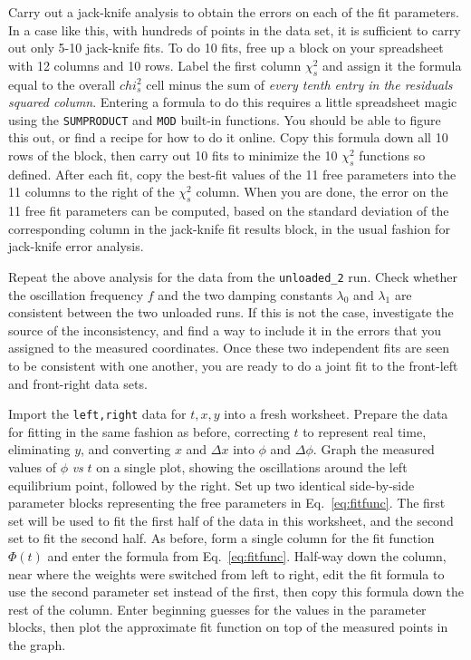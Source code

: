\documentclass{revtex4}
\begin{document}
Carry out a jack-knife analysis to obtain the errors on each of the fit
parameters.  In a case like this, with hundreds of points in the data set,
it is sufficient to carry out only 5-10 jack-knife fits.  To do 10 fits,
free up a block on your spreadsheet with 12 columns and 10 rows.  Label the
first column $\chi_s^2$ and assign it the formula equal to the overall
$chi_s^2$ cell minus the sum of {\em every tenth entry in the residuals
squared column}.  Entering a formula to do this requires a little
spreadsheet magic using the {\tt SUMPRODUCT} and {\tt MOD}
built-in functions.  You should be able to figure this out, or find a
recipe for how to do it online.  Copy this formula down all 10 rows of
the block, then carry out 10 fits to minimize the 10 $\chi_s^2$ functions
so defined.  After each fit, copy the best-fit values of the 11 free
parameters into the 11 columns to the right of the $\chi_s^2$ column.
When you are done, the error on the 11 free fit parameters can be
computed, based on the standard deviation of the corresponding column
in the jack-knife fit results block, in the usual fashion for jack-knife
error analysis.

Repeat the above analysis for the data from the {\tt unloaded\_2} run.
Check whether the oscillation frequency $f$ and the two damping constants
$\lambda_0$ and $\lambda_1$ are consistent between the two unloaded runs.
If this is not the case, investigate the source of the inconsistency, and
find a way to include it in the errors that you assigned to the measured
coordinates.  Once these two independent fits are seen to be consistent
with one another, you are ready to do a joint fit to the front-left and
front-right data sets.

Import the {\tt left,right} data for $t,x,y$ into a fresh worksheet.  
Prepare the data for fitting in the same fashion as before, correcting $t$
to represent real time, eliminating $y$, and converting $x$ and $\Delta x$
into $\phi$ and $\Delta\phi$.  Graph the measured values of $\phi$ {\em vs}
$t$ on a single plot, showing the oscillations around the left equilibrium
point, followed by the right.  Set up two identical side-by-side
parameter blocks representing the free parameters in Eq.~\ref{eq:fitfunc}.
The first set will be used to fit the first half of the data in this worksheet,
and the second set to fit the second half.  As before, form a single column
for the fit function $\Phi(t)$ and enter the formula from Eq.~\ref{eq:fitfunc}.
Half-way down the column, near where the weights were switched from left to
right, edit the fit formula to use the second parameter set instead of the
first, then copy this formula down the rest of the column.  Enter beginning
guesses for the values in the parameter blocks, then plot the approximate
fit function on top of the measured points in the graph.
\end{document}
